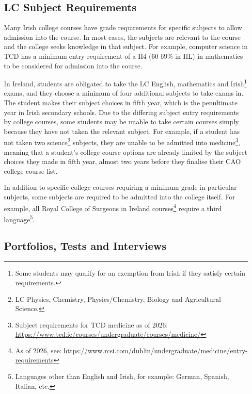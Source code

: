 \subsection{LC Subject Requirements}
Many Irish college courses have grade requirements for specific subjects to allow admission into the course.
In most cases, the subjects are relevant to the course and the college seeks knowledge in that subject.
For example, computer science in TCD has a minimum entry requirement of a H4 (60-69\% in HL) in mathematics 
to be considered for admission into the course.

In Ireland, students are obligated to take the LC English, mathematics and Irish\footnote{Some students may qualify for an exemption from Irish if they satisfy certain requirements.} exams,
and they choose a minimum of four additional subjects to take exams in.
The student makes their subject choices in fifth year, which is the penultimate year in Irish secondary schools.
Due to the differing subject entry requirements by college courses, some students may be unable to take certain courses 
simply because they have not taken the relevant subject.
For example, if a student has not taken two science\footnote{LC Physics, Chemistry, Physics/Chemistry, Biology and Agricultural Science.} subjects,
they are unable to be admitted into medicine\footnote{Subject requirements for TCD medicine as of 2026: \url{https://www.tcd.ie/courses/undergraduate/courses/medicine/}},
meaning that a student's college course options are already limited by the subject choices they made in fifth year, almost two years before they finalise their CAO college course list.

In addition to specific college courses requiring a minimum grade in particular subjects,
some subjects are required to be admitted into the college itself.
For example, all Royal College of Surgeons in Ireland courses\footnote{As of 2026, see: \url{https://www.rcsi.com/dublin/undergraduate/medicine/entry-requirements}} require a third language\footnote{Languages other than English and Irish, for example: German, Spanish, Italian, etc.}.

\subsection{Portfolios, Tests and Interviews}
\label{sec:portfolios-etc}

